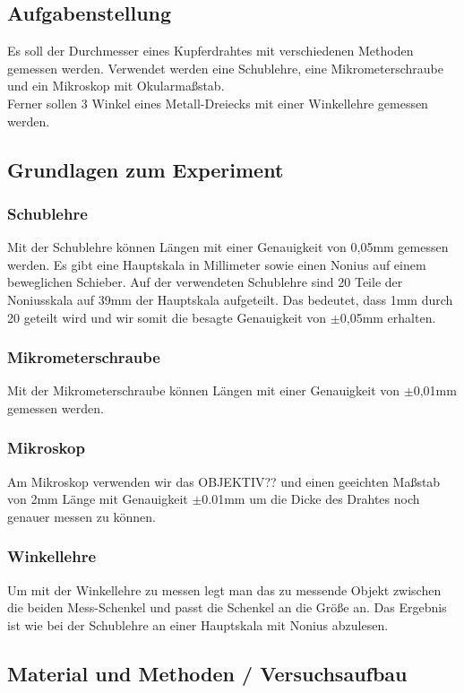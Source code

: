 \documentclass{article}
\begin{document}
\subsection{Aufgabenstellung}
Es soll der Durchmesser eines Kupferdrahtes mit verschiedenen Methoden gemessen werden. Verwendet werden eine Schublehre, eine Mikrometerschraube und ein Mikroskop mit Okularmaßstab.\\
Ferner sollen 3 Winkel eines Metall-Dreiecks mit einer Winkellehre gemessen werden.

\subsection{Grundlagen zum Experiment}
\subsubsection*{Schublehre}
Mit der Schublehre können Längen mit einer Genauigkeit von 0,05mm gemessen werden. Es gibt eine Hauptskala in Millimeter sowie einen Nonius auf einem beweglichen Schieber. Auf der verwendeten Schublehre sind 20 Teile der Noniusskala auf 39mm der Hauptskala aufgeteilt. Das bedeutet, dass 1mm durch 20 geteilt wird und wir somit die besagte Genauigkeit von $\pm$0,05mm erhalten.\\
\subsubsection*{Mikrometerschraube}
Mit der Mikrometerschraube können Längen mit einer Genauigkeit von $\pm$0,01mm gemessen werden.

\subsubsection*{Mikroskop}
Am Mikroskop verwenden wir das OBJEKTIV?? und einen geeichten Maßstab von 2mm Länge mit Genauigkeit $\pm$0.01mm um die Dicke des Drahtes noch genauer messen zu können. 
\subsubsection*{Winkellehre}
Um mit der Winkellehre zu messen legt man das zu messende Objekt zwischen die beiden Mess-Schenkel und passt die Schenkel an die Größe an. Das Ergebnis ist wie bei der Schublehre an einer Hauptskala mit Nonius abzulesen.

\subsection{Material und Methoden / Versuchsaufbau}
\end{document}
